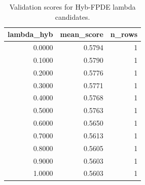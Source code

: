 \begin{table}[t]
\caption{Validation scores for Hyb-FPDE lambda candidates.}
\label{tab:lambda_distribution_computed}
\centering
\begin{tabular}{rrr}
\toprule
lambda\_hyb & mean\_score & n\_rows \\
\midrule
0.0000 & 0.5794 & 1 \\
0.1000 & 0.5790 & 1 \\
0.2000 & 0.5776 & 1 \\
0.3000 & 0.5771 & 1 \\
0.4000 & 0.5768 & 1 \\
0.5000 & 0.5763 & 1 \\
0.6000 & 0.5650 & 1 \\
0.7000 & 0.5613 & 1 \\
0.8000 & 0.5605 & 1 \\
0.9000 & 0.5603 & 1 \\
1.0000 & 0.5603 & 1 \\
\bottomrule
\end{tabular}

\end{table}
